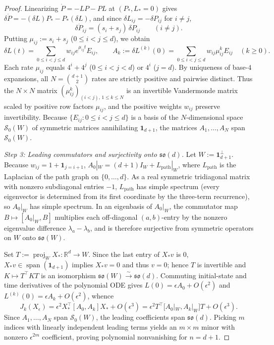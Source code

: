 \documentclass[11pt]{article}
\theoremstyle{plain}
\theoremstyle{definition}
\theoremstyle{remark}
\DeclareMathOperator{\spn}{span}
\DeclareMathOperator{\proj}{proj}
\begin{document}
\begin{proof}
Linearizing $\dot{P} = -LP - PL$ at $(P_*, L_* = 0)$ gives $\delta\dot{P} = -(\delta L)P_* - P_*(\delta L)$, and since $\delta L_{ij} = -\delta P_{ij}$ for $i \neq j$,
\[
\delta\dot{P}_{ij} = (s_i + s_j)\,\delta P_{ij} \qquad (i \neq j).
\]
Putting $\mu_{ij} := s_i + s_j$ ($0 \le i < j \le d$), we obtain
\[
\delta L(t) = \sum_{0 \le i < j \le d} w_{ij} e^{\mu_{ij} t} E_{ij},
\qquad
A_k := \delta L^{(k)}(0) = \sum_{0 \le i < j \le d} w_{ij} \mu_{ij}^k E_{ij} \quad (k \ge 0).
\]
Each rate $\mu_{ij}$ equals $4^i + 4^j$ ($0 \le i < j < d$) or $4^i$ ($j = d$).
By uniqueness of base-$4$ expansions, all $N = \binom{d+1}{2}$ rates are strictly positive and pairwise distinct.
Thus the $N \times N$ matrix $(\mu_{ij}^k)_{(i<j),\, 1 \le k \le N}$ is an invertible Vandermonde matrix scaled by positive row factors $\mu_{ij}$, and the positive weights $w_{ij}$ preserve invertibility.
Because $\{E_{ij} : 0 \le i < j \le d\}$ is a basis of the $N$-dimensional space $\mathcal{S}_0(W)$ of symmetric matrices annihilating $\mathbf{1}_{d+1}$, the matrices $A_1, \dots, A_N$ span $\mathcal{S}_0(W)$.

\emph{Step 3: Leading commutators and surjectivity onto $\mathfrak{so}(d)$.}
Let $W := \mathbf{1}_{d+1}^\perp$.
Because $w_{ij} = 1 + \mathbf{1}_{j=i+1}$, $A_0|_W = (d+1)I_W + L_{\mathrm{path}}|_W$, where $L_{\mathrm{path}}$ is the Laplacian of the path graph on $\{0, \dots, d\}$.
As a real symmetric tridiagonal matrix with nonzero subdiagonal entries $-1$, $L_{\mathrm{path}}$ has simple spectrum (every eigenvector is determined from its first coordinate by the three-term recurrence), so $A_0|_W$ has simple spectrum.
In an eigenbasis of $A_0|_W$, the commutator map $B \mapsto [A_0|_W, B]$ multiplies each off-diagonal $(a, b)$-entry by the nonzero eigenvalue difference $\lambda_a - \lambda_b$, and is therefore surjective from symmetric operators on $W$ onto $\mathfrak{so}(W)$.

Set $T := \proj_W X_* : \mathbb{R}^d \to W$.
Since the last entry of $X_* v$ is $0$, $X_* v \in \spn(\mathbf{1}_{d+1})$ implies $X_* v = 0$ and thus $v = 0$; hence $T$ is invertible and $K \mapsto T^\top K T$ is an isomorphism $\mathfrak{so}(W) \xrightarrow{\sim} \mathfrak{so}(d)$.
Commuting initial-state and time derivatives of the polynomial ODE gives $L(0) = \epsilon A_0 + O(\epsilon^2)$ and $L^{(k)}(0) = \epsilon A_k + O(\epsilon^2)$, whence
\[
J_k(X_\epsilon) = \epsilon^2 X_*^\top [A_0, A_k] X_* + O(\epsilon^3) = \epsilon^2 T^\top\bigl[A_0|_W, A_k|_W\bigr]T + O(\epsilon^3).
\]
Since $A_1, \dots, A_N$ span $\mathcal{S}_0(W)$, the leading coefficients span $\mathfrak{so}(d)$.
Picking $m$ indices with linearly independent leading terms yields an $m \times m$ minor with nonzero $\epsilon^{2m}$ coefficient, proving polynomial nonvanishing for $n = d + 1$.


\end{proof}
\end{document}

